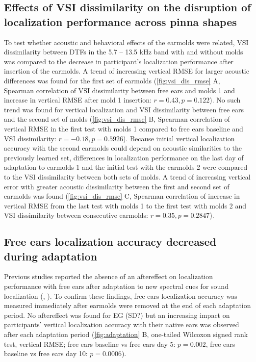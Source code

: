 \subsection{Effects of VSI dissimilarity on the disruption of localization performance across pinna shapes}

To test whether acoustic and behavioral effects of the earmolds were related, VSI dissimilarity between DTFs in the 5.7 – 13.5 kHz band with and without molds was compared to the decrease in participant’s localization performance after insertion of the earmolds. A trend of increasing vertical RMSE for larger acoustic differences was found for the first set of earmolds (\cref{fig:vsi_dis_rmse} A, Spearman correlation of VSI dissimilarity between free ears and molds 1 and increase in vertical RMSE after mold 1 insertion: $r = 0.43, p = 0.122$). No such trend was found for vertical localization and VSI dissimilarity between free ears and the second set of molds (\cref{fig:vsi_dis_rmse} B, Spearman correlation of vertical RMSE in the first test with molds 1 compared to free ears baseline and VSI dissimilarity: $r = - 0.18, p = 0.5926$). Because initial vertical localization accuracy with the second earmolds could depend on acoustic similarities to the previously learned set, differences in localization performance on the last day of adaptation to earmolds 1 and the initial test with the earmolds 2 were compared to the VSI dissimilarity between both sets of molds. A trend of increasing vertical error with greater acoustic dissimilarity between the first and second set of earmolds was found (\cref{fig:vsi_dis_rmse} C, Spearman correlation of increase in vertical RMSE from the last test with molds 1 to the first test with molds 2 and VSI dissimilarity between consecutive earmolds: $r = 0.35, p = 0.2847$). 

\subsection{Free ears localization accuracy decreased during adaptation}

Previous studies reported the absence of an aftereffect on localization performance with free ears after adaptation to new spectral cues for sound localization (\citet{hofman_relearning_1998}, \citet{trapeau_fast_2016}). To confirm these findings, free ears localization accuracy was measured immediately after earmolds were removed at the end of each adaptation period. No aftereffect was found for EG (SD?) but an increasing impact on participants’ vertical localization accuracy with their native ears was observed after each adaptation period (\cref{fig:adaptation} B, one-tailed Wilcoxon signed rank test, vertical RMSE; free ears baseline vs free ears day 5: $p = 0.002$, free ears baseline vs free ears day 10: $p = 0.0006$). 

